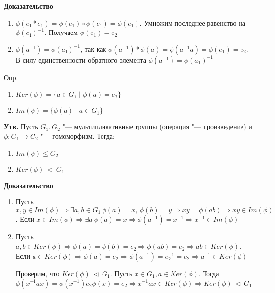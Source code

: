 \documentclass{article}
\begin{document}
\textbf{Доказательство}
\begin{enumerate}
	\item $\phi(e_1*e_1) = \phi(e_1) \circ \phi(e_1) = \phi(e_1)$. Умножим последнее равенство на $\phi(e_1)^{-1}$. Получаем $\phi(e_1) = e_2$
	\item $\phi(a^{-1}) = \phi(a_1)^{-1}$, так как $\phi(a^{-1})*\phi(a) = \phi(a^{-1}a) = \phi(e_1) = e_2$. В силу единственности обратного элемента $\phi(a^{-1}) = \phi(a_1)^{-1}$
\end{enumerate}

\vspace{10pt}

\underline{Опр.}
\begin{enumerate}
	\item $Ker(\phi) = \{a \in G_1 \mid \phi(a) = e_2 \}$
	\item $Im(\phi) = \{\phi(a) \mid a \in G_1 \}$
\end{enumerate}

\vspace{10pt}

\textbf{Утв.}
Пусть $G_1, G_2$ "--- мультипликативные группы (операция "--- произведение) и $\phi : G_1 \rightarrow G_2$ "--- гомоморфизм. Тогда:
\begin{enumerate}
	\item $Im(\phi) \leq G_2$
	\item $Ker(\phi) \  \triangleleft \  G_1$
\end{enumerate}

\textbf{Доказательство}
\begin{enumerate}
	\item Пусть $x, y \in Im(\phi) \Rightarrow \exists a, b \in G_1 \  \phi(a) = x, \  \phi(b) = y \Rightarrow xy = \phi(ab) \Rightarrow xy \in Im(\phi)$. Если $x \in Im(\phi) \Rightarrow \exists a \  \phi(a) = x \Rightarrow \phi(a^{-1}) = x^{-1} \Rightarrow x^{-1} \in Im(\phi)$
	\item Пусть $a, b \in Ker(\phi) \Rightarrow \phi(a) = \phi(b) = e_2 \Rightarrow \phi(ab) = e_2 \Rightarrow ab \in Ker(\phi)$. Если $a \in Ker(\phi) \Rightarrow \phi(a) = e_2 \Rightarrow \phi(a^{-1}) = e_2^{-1} = e_2 \Rightarrow a^{-1} \in Ker(\phi)$
	
	Проверим, что $Ker(\phi) \  \triangleleft \  G_1$.
	Пусть $x \in G_1, a \in Ker(\phi)$. Тогда $\phi(x^{-1}ax) = \phi(x^{-1})e_2\phi(x) = e_2 \Rightarrow x^{-1}ax \in Ker(\phi) \Rightarrow Ker(\phi) \  \triangleleft \  G_1$ 
\end{enumerate}
\end{document}
